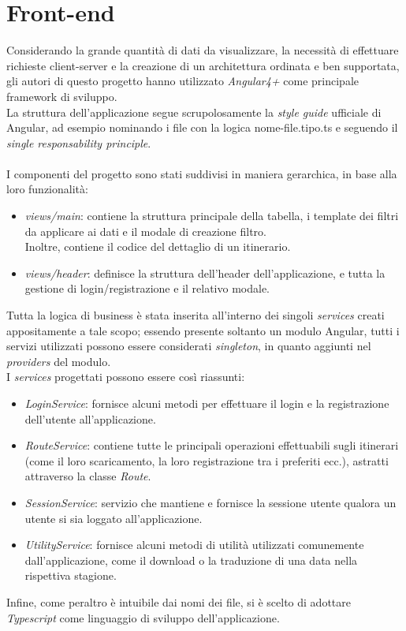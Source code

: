 \documentclass[11pt]{report}
\begin{document}
\section{Front-end}
Considerando la grande quantità di dati da visualizzare, la necessità di effettuare richieste client-server e la creazione di un architettura ordinata e ben supportata, gli autori di questo progetto hanno utilizzato \textit{Angular4+} come principale framework di sviluppo.
\\La struttura dell'applicazione segue scrupolosamente la \textit{style guide} ufficiale di Angular, ad esempio nominando i file con la logica nome-file.tipo.ts e seguendo il \textit{single responsability principle}.
\\\\I componenti del progetto sono stati suddivisi in maniera gerarchica, in base alla loro funzionalità:
\begin{itemize}
	\item \textit{views/main}: contiene la struttura principale della tabella, i template dei filtri da applicare ai dati e il modale di creazione filtro.
	\\Inoltre, contiene il codice del dettaglio di un itinerario.
	\item \textit{views/header}: definisce la struttura dell'header dell'applicazione, e tutta la gestione di login/registrazione e il relativo modale.
\end{itemize}
Tutta la logica di business è stata inserita all'interno dei singoli \textit{services} creati appositamente a tale scopo; essendo presente soltanto un modulo Angular, tutti i servizi utilizzati possono essere considerati \textit{singleton}, in quanto aggiunti nel \textit{providers} del modulo.
\\I \textit{services} progettati possono essere così riassunti:
\begin{itemize}
	\item \textit{LoginService}: fornisce alcuni metodi per effettuare il login e la registrazione dell'utente all'applicazione.
	\item \textit{RouteService}: contiene tutte le principali operazioni effettuabili sugli itinerari (come il loro scaricamento, la loro registrazione tra i preferiti ecc.), astratti attraverso la classe \textit{Route}.
	\item \textit{SessionService}: servizio che mantiene e fornisce la sessione utente qualora un utente si sia loggato all'applicazione.
	\item \textit{UtilityService}: fornisce alcuni metodi di utilità utilizzati comunemente dall'applicazione, come il download o la traduzione di una data nella rispettiva stagione.
\end{itemize}
Infine, come peraltro è intuibile dai nomi dei file, si è scelto di adottare \textit{Typescript} come linguaggio di sviluppo dell'applicazione.
\pagebreak
\end{document}
